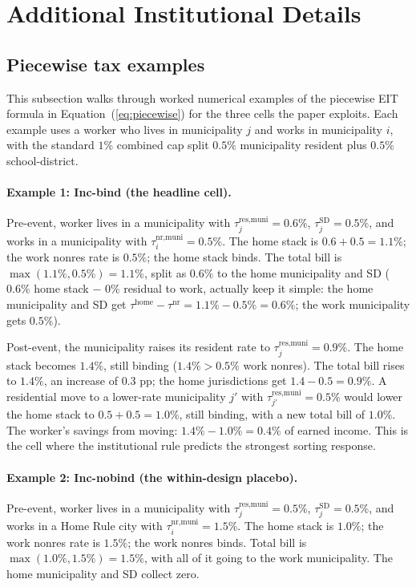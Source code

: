 \documentclass[12pt]{article}
\begin{document}
\section{Additional Institutional Details}
\label{app:theory}

\subsection{Piecewise tax examples}
\label{app:theory-piecewise}

This subsection walks through worked numerical examples of the
piecewise EIT formula in Equation~(\ref{eq:piecewise}) for the three
cells the paper exploits. Each example uses a worker
who lives in municipality $j$ and works in municipality $i$, with the standard
$1\%$ combined cap split $0.5\%$ municipality resident plus $0.5\%$
school-district.

\paragraph{Example 1: Inc-bind (the headline cell).}
Pre-event, worker lives in a municipality with
$\tau^{\text{res,muni}}_j = 0.6\%$, $\tau^{\text{SD}}_j = 0.5\%$,
and works in a municipality with $\tau^{\text{nr,muni}}_i = 0.5\%$. The
home stack is $0.6 + 0.5 = 1.1\%$; the work nonres rate is $0.5\%$;
the home stack binds. The total bill is $\max(1.1\%, 0.5\%) =
1.1\%$, split as $0.6\%$ to the home municipality and SD ($0.6\%$ home
stack $-$ $0\%$ residual to work, actually keep it simple: the home
municipality and SD get $\tau^{\text{home}} - \tau^{\text{nr}} = 1.1\% -
0.5\% = 0.6\%$; the work municipality gets $0.5\%$).

Post-event, the municipality raises its resident rate to
$\tau^{\text{res,muni}}_j = 0.9\%$. The home stack becomes $1.4\%$,
still binding ($1.4\% > 0.5\%$ work nonres). The total bill rises
to $1.4\%$, an increase of $0.3$ pp; the home jurisdictions get
$1.4 - 0.5 = 0.9\%$. A residential move to a lower-rate municipality $j'$
with $\tau^{\text{res,muni}}_{j'} = 0.5\%$ would lower the home
stack to $0.5 + 0.5 = 1.0\%$, still binding, with a new total bill
of $1.0\%$. The worker's savings from moving:
$1.4\% - 1.0\% = 0.4\%$ of earned income. This is the cell where
the institutional rule predicts the strongest sorting response.

\paragraph{Example 2: Inc-nobind (the within-design placebo).}
Pre-event, worker lives in a municipality with
$\tau^{\text{res,muni}}_j = 0.5\%$, $\tau^{\text{SD}}_j = 0.5\%$,
and works in a Home Rule city with
$\tau^{\text{nr,muni}}_i = 1.5\%$. The home stack is $1.0\%$; the
work nonres rate is $1.5\%$; the work nonres binds. Total bill is
$\max(1.0\%, 1.5\%) = 1.5\%$, with all of it going to the work
municipality. The home municipality and SD collect zero.
\end{document}
